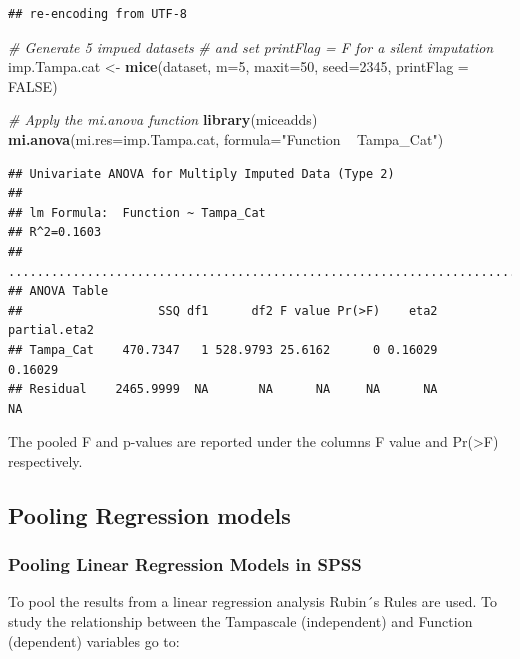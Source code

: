 \documentclass[
]{book}
\newenvironment{Shaded}{\begin{snugshade}}{\end{snugshade}}
\newcommand{\CommentTok}[1]{\textcolor[rgb]{0.56,0.35,0.01}{\textit{#1}}}
\newcommand{\DataTypeTok}[1]{\textcolor[rgb]{0.13,0.29,0.53}{#1}}
\newcommand{\DecValTok}[1]{\textcolor[rgb]{0.00,0.00,0.81}{#1}}
\newcommand{\KeywordTok}[1]{\textcolor[rgb]{0.13,0.29,0.53}{\textbf{#1}}}
\newcommand{\NormalTok}[1]{#1}
\newcommand{\OtherTok}[1]{\textcolor[rgb]{0.56,0.35,0.01}{#1}}
\newcommand{\StringTok}[1]{\textcolor[rgb]{0.31,0.60,0.02}{#1}}
\begin{document}
\begin{verbatim}
## re-encoding from UTF-8
\end{verbatim}

\begin{Shaded}
\begin{Highlighting}[]
\CommentTok{# Generate 5 impued datasets }
\CommentTok{# and set printFlag = F for a silent imputation}
\NormalTok{imp.Tampa.cat <-}\StringTok{ }\KeywordTok{mice}\NormalTok{(dataset, }\DataTypeTok{m=}\DecValTok{5}\NormalTok{, }\DataTypeTok{maxit=}\DecValTok{50}\NormalTok{, }\DataTypeTok{seed=}\DecValTok{2345}\NormalTok{, }\DataTypeTok{printFlag =} \OtherTok{FALSE}\NormalTok{)}

\CommentTok{# Apply the mi.anova function}
\KeywordTok{library}\NormalTok{(miceadds)}
\KeywordTok{mi.anova}\NormalTok{(}\DataTypeTok{mi.res=}\NormalTok{imp.Tampa.cat, }\DataTypeTok{formula=}\StringTok{"Function ~ Tampa_Cat"}\NormalTok{)}
\end{Highlighting}
\end{Shaded}

\begin{verbatim}
## Univariate ANOVA for Multiply Imputed Data (Type 2)  
## 
## lm Formula:  Function ~ Tampa_Cat
## R^2=0.1603 
## ..........................................................................
## ANOVA Table 
##                   SSQ df1      df2 F value Pr(>F)    eta2 partial.eta2
## Tampa_Cat    470.7347   1 528.9793 25.6162      0 0.16029      0.16029
## Residual    2465.9999  NA       NA      NA     NA      NA           NA
\end{verbatim}

The pooled F and p-values are reported under the columns F value and
Pr(\textgreater F) respectively.

\hypertarget{pooling-regression-models}{%
\subsection{Pooling Regression models}\label{pooling-regression-models}}

\hypertarget{pooling-linear-regression-models-in-spss}{%
\subsubsection{Pooling Linear Regression Models in
SPSS}\label{pooling-linear-regression-models-in-spss}}

To pool the results from a linear regression analysis Rubin´s Rules are
used. To study the relationship between the Tampascale (independent) and
Function (dependent) variables go to:
\end{document}
